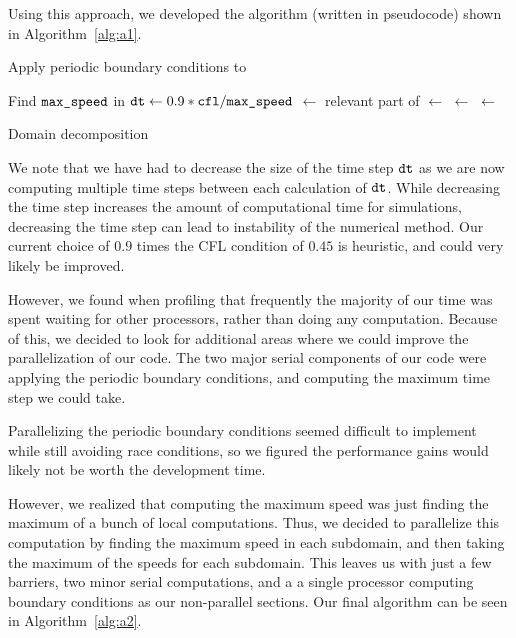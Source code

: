 Using this approach, we developed the algorithm (written in pseudocode) shown in Algorithm~\ref{alg:a1}.

\begin{algorithm}
\begin{algorithmic}[1]
\item Apply periodic boundary conditions to 
\item Find $\texttt{max\_speed}$ in 
\State $\texttt{dt} \gets 0.9*\texttt{cfl} / \texttt{max\_speed}$
	\State {} $\gets$ relevant part of 
		\State {} $\gets$  
		\State {} $\gets$ 
	\EndFor
	\State {} $\gets$ 
\EndFor
\end{algorithmic}
\caption{Domain decomposition}
\label{alg:a1}
\end{algorithm}

We note that we have had to decrease the size of the time step $\texttt{dt}$ as we are now computing multiple time steps between each calculation of $\texttt{dt}$. While decreasing the time step increases the amount of computational time for simulations, decreasing the time step can lead to instability of the numerical method. Our current choice of $0.9$ times the CFL condition of $0.45$ is heuristic, and could very likely be improved.

However, we found when profiling that frequently the majority of our time was spent waiting for other processors, rather than doing any computation. Because of this, we decided to look for additional areas where we could improve the parallelization of our code. The two major serial components of our code were applying the periodic boundary conditions, and computing the maximum time step we could take.

Parallelizing the periodic boundary conditions seemed difficult to implement while still avoiding race conditions, so we figured the performance gains would likely not be worth the development time.

However, we realized that computing the maximum speed was just finding the maximum of a bunch of local computations. Thus, we decided to parallelize this computation by finding the maximum speed in each subdomain, and then taking the maximum of the speeds for each subdomain. This leaves us with just a few barriers, two minor serial computations, and a a single processor computing boundary conditions as our non-parallel sections. Our final algorithm can be seen in Algorithm~\ref{alg:a2}.

